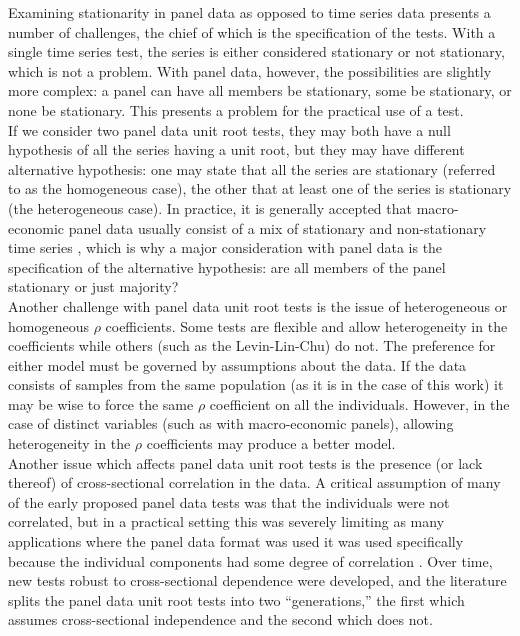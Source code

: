 Examining stationarity in panel data as opposed to time series data presents a number of challenges, the chief of which is the specification of the tests. With a single time series test, the series is either considered stationary or not stationary, which is not a problem. With panel data, however, the possibilities are slightly more complex: a panel can have all members be stationary, some be stationary, or none be stationary. This presents a problem for the practical use of a test.\\ If we consider two panel data unit root tests, they may both have a null hypothesis of all the series having a unit root, but they may have different alternative hypothesis: one may state that all the series are stationary (referred to as the homogeneous case), the other that at least one of the series is stationary (the heterogeneous case). In practice, it is generally accepted that macro-economic panel data usually consist of a mix of stationary and non-stationary time series \citep{hurlin}, which is why a major consideration with panel data is the specification of the alternative hypothesis: are all members of the panel stationary or just majority? \\Another challenge with panel data unit root tests is the issue of heterogeneous or homogeneous $\rho$ coefficients. Some tests are flexible and allow heterogeneity in the coefficients while others (such as the Levin-Lin-Chu) do not. The preference for either model must be governed by assumptions about the data. If the data consists of samples from the same population (as it is in the case of this work) it may be wise to force the same $\rho$ coefficient on all the individuals. However, in the case of distinct variables (such as with macro-economic panels), allowing heterogeneity in the $\rho$ coefficients may produce a better model. \\Another issue which affects panel data unit root tests is the presence (or lack thereof) of cross-sectional correlation in the data. A critical assumption of many of the early proposed panel data tests was that the individuals were not correlated, but in a practical setting this was severely limiting as many applications where the panel data format was used it was used specifically because the individual components had some degree of correlation \citep{panic04}. Over time, new tests robust to cross-sectional dependence were developed, and the literature splits the panel data unit root tests into two “generations,” the first which assumes cross-sectional independence and the second which does not.

